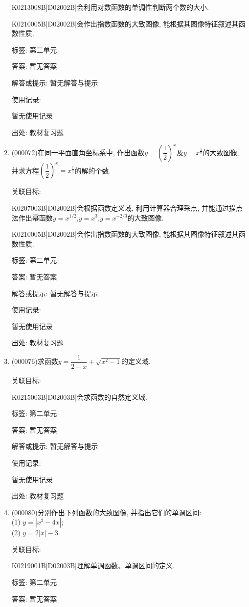\documentclass[10pt,a4paper]{article}
\begin{document}
\begin{enumerate}[1.]
K0213008B|D02002B|会利用对数函数的单调性判断两个数的大小.

K0210005B|D02002B|会作出指数函数的大致图像, 能根据其图像特征叙述其函数性质.



标签: 第二单元

答案: 暂无答案

解答或提示: 暂无解答与提示

使用记录:

暂无使用记录


出处: 教材复习题
\item { (000072)}在同一平面直角坐标系中, 作出函数$y=(\dfrac 12)^x$及$y=x^{\frac 12}$的大致图像, 并求方程$(\dfrac 12)^x=x^{\frac 12}$的解的个数.


关联目标:

K0207003B|D02002B|会根据函数定义域, 利用计算器合理采点, 并能通过描点法作出幂函数$y=x^{1/2}$,$y=x^{3}$,$y=x^{-2/3}$的大致图像.

K0210005B|D02002B|会作出指数函数的大致图像, 能根据其图像特征叙述其函数性质.



标签: 第二单元

答案: 暂无答案

解答或提示: 暂无解答与提示

使用记录:

暂无使用记录


出处: 教材复习题
\item { (000076)}求函数$y=\dfrac1{2-x}+\sqrt{x^2-1}$的定义域.


关联目标:

K0215003B|D02003B|会求函数的自然定义域.



标签: 第二单元

答案: 暂无答案

解答或提示: 暂无解答与提示

使用记录:

暂无使用记录


出处: 教材复习题
\item { (000080)}分别作出下列函数的大致图像, 并指出它们的单调区间:\\
(1) $y=|x^2-4x|$;\\
(2) $y=2|x|-3$.


关联目标:

K0219001B|D02003B|理解单调函数、单调区间的定义.



标签: 第二单元

答案: 暂无答案


\end{enumerate}
\end{document}
